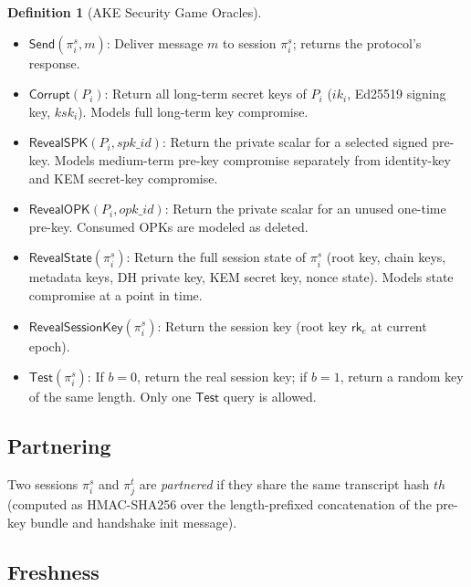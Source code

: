 \documentclass[11pt,a4paper]{article}
\theoremstyle{definition}
\newtheorem{definition}[theorem]{Definition}
\theoremstyle{remark}
\newcommand{\rk}{\mathsf{rk}}
\begin{document}
\begin{definition}[AKE Security Game Oracles]
\label{def:oracles}
\begin{itemize}[nosep]
  \item $\mathsf{Send}(\pi_i^s, m)$: Deliver message $m$ to session $\pi_i^s$;
        returns the protocol's response.
  \item $\mathsf{Corrupt}(P_i)$: Return all long-term secret keys of $P_i$
        ($ik_i$, Ed25519 signing key, $\mathit{ksk}_i$). Models full
        long-term key compromise.
  \item $\mathsf{RevealSPK}(P_i,\mathit{spk\_id})$: Return the private scalar
        for a selected signed pre-key. Models medium-term pre-key compromise
        separately from identity-key and KEM secret-key compromise.
  \item $\mathsf{RevealOPK}(P_i,\mathit{opk\_id})$: Return the private scalar
        for an unused one-time pre-key. Consumed OPKs are modeled as deleted.
  \item $\mathsf{RevealState}(\pi_i^s)$: Return the full session state of
        $\pi_i^s$ (root key, chain keys, metadata keys, DH private key,
        KEM secret key, nonce state). Models state compromise at a point in time.
  \item $\mathsf{RevealSessionKey}(\pi_i^s)$: Return the session key
        (root key $\rk_e$ at current epoch).
  \item $\mathsf{Test}(\pi_i^s)$: If $b = 0$, return the real session key;
        if $b = 1$, return a random key of the same length.  Only one
        $\mathsf{Test}$ query is allowed.
\end{itemize}
\end{definition}

\subsection{Partnering}

Two sessions $\pi_i^s$ and $\pi_j^t$ are \emph{partnered} if they share the
same transcript hash $\mathit{th}$ (computed as HMAC-SHA256 over the
length-prefixed concatenation of the pre-key bundle and handshake init message).

\subsection{Freshness}
\end{document}
